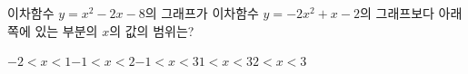 이차함수 $y=x^2-2x-8$의 그래프가 이차함수 $y=-2x^2+x-2$의 그래프보다 아래쪽에 있는 부분의 $x$의 값의 범위는?
\begin{choices32}{$-2<x<1$}{$-1<x<2$}{$-1<x<3$}{$1<x<3$}{$2<x<3$}\end{choices32}
